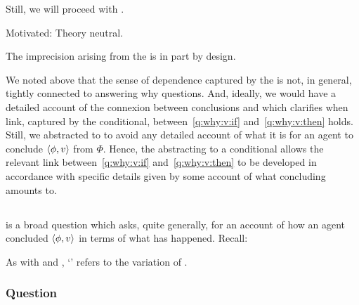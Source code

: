 \begin{note}
  Still, we will proceed with \qWhyV{}.

  Motivated:
  Theory neutral.

  The imprecision arising from the \itc{} is in part by design.

  We noted above that the sense of dependence captured by the \itc{} is not, in general, tightly connected to answering why questions.
  And, ideally, we would have a detailed account of the connexion between conclusions and  which clarifies when link, captured by the conditional, between~\ref{q:why:v:if} and~\ref{q:why:v:then} holds.
  Still, we abstracted to  to avoid any detailed account of what it is for an agent to conclude \(\langle \phi, v \rangle\) from \(\Phi\).
  Hence, the abstracting to a conditional allows the relevant link between~\ref{q:why:v:if} and~\ref{q:why:v:then} to be developed in accordance with specific details given by some account of what concluding amounts to.
\end{note}


\subsection{\qHowV{}}
\label{cha:var:sec:vars:qhowv}

\begin{note}
  \qHow{} is a broad question which asks, quite generally, for an account of how an agent concluded \(\langle \phi, v \rangle\) in terms of what has happened.
  Recall:

  \questionHowBasic*

  As with \qWhy{} and \qWhyV{}, `\qHowV{}' refers to the variation of \qHow{}.
\end{note}

\subsubsection{Question}
\label{cha:var:sec:vars:qhowv:sec:question}

